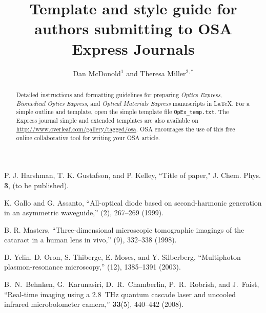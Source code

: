 \documentclass[10pt,letterpaper]{article}
\begin{document}
\title{Template and style guide for authors submitting to OSA Express Journals}

\author{Dan McDonold$^1$ and Theresa Miller$^{2,*}$}

\address{$^1$Peer Review, Publications Department, Optical Society of America, Washington, D.C., 20036, USA\\
$^2$Publications Department, Optical Society of America, Washington, D.C., 20036, USA}




\begin{abstract}
Detailed instructions and formatting guidelines for preparing \textit{Optics Express}, \textit{Biomedical Optics Express}, and \textit{Optical Materials Express} manuscripts in \LaTeX. For a simple outline and template, open the simple template file \texttt{OpEx\_temp.txt}. The Express journal simple and extended templates are also available on \url{http://www.overleaf.com/gallery/tagged/osa}. OSA encourages the use of this free online collaborative tool for writing your OSA article.
\end{abstract}


\begin{thebibliography}{99}
P. J. Harshman, T. K. Gustafson, and P. Kelley, ``Title of paper," J. Chem. Phys. {\bf 3}, (to be published).

 K. Gallo and G. Assanto, ``All-optical diode based on second-harmonic generation in an asymmetric waveguide,'' (2), 267--269 (1999).

 B. R. Masters, ``Three-dimensional microscopic tomographic imagings of the cataract in a human lens in vivo,'' (9), 332--338 (1998).

 D. Yelin,  D. Oron,  S. Thiberge,  E. Moses, and Y. Silberberg, ``Multiphoton plasmon-resonance microscopy,'' (12), 1385--1391 (2003).

B.~N.~Behnken, G.~Karunasiri, D.~R.~Chamberlin, P.~R.~Robrish, and J.~Faist,
``Real-time imaging using a 2.8~THz quantum cascade laser and uncooled infrared microbolometer camera,''
\ol \textbf{33}(5), 440--442 (2008).

\end{thebibliography}
\end{document}
